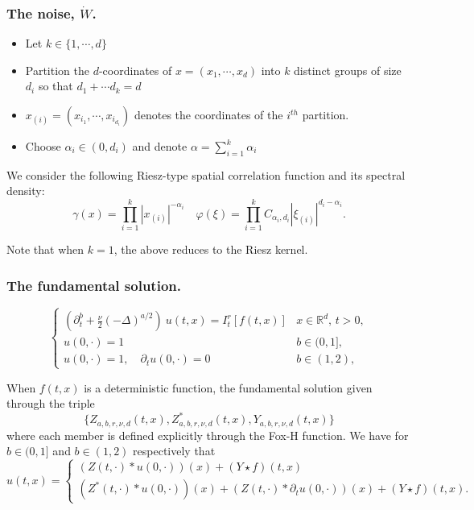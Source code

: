 \documentclass{beamer}%
\numberwithin{equation}{section}
\newcommand{\R}{\mathbb{R}}
\begin{document}
	\begin{frame}[t]
		\frametitle{The noise, $\dot{W}$.}
		\begin{itemize}
			\item Let $k \in \{1,\cdots,d\}$
			\item Partition the $d$-coordinates of $x=(x_1,\cdots,x_d)$ into $k$ distinct groups of size $d_i$ so that $d_1 + \cdots d_k =d$
			\item $x_{(i)} = (x_{i_1},\cdots, x_{i_{d_i}})$ denotes the coordinates of the $i^{th}$ partition.
			\item Choose $\alpha_i \in (0,d_i)$ and denote $\alpha = \sum_{i=1}^k\alpha_i$
		\end{itemize}

		We consider the following Riesz-type spatial correlation function and its spectral density:
		\[
		\gamma(x) = \prod_{i=1}^k |x_{(i)}|^{-\alpha_i} \quad \varphi(\xi) = \prod_{i=1}^k C_{\alpha_i,d_i} |{\xi}_{(i)}|^{d_i-\alpha_i}.
		\]

		Note that when $k=1$, the above reduces to the Riesz kernel.
	\end{frame}

	\begin{frame}[t]
		\frametitle{The fundamental solution.}
		\[
		\begin{cases}
		\left(\partial^b_t + \frac{\nu}{2}(-\Delta)^{a/2}\right)\: u(t,x) = I^r_t \left[f(t,x)\right] & \text{$x\in \R^d$, $t>0$}, \\
		u(0,\cdot) = 1                                                                                                             & b \in (0,1],               \\
		u(0,\cdot) = 1, \quad \partial_t u(0,\cdot) = 0                                                                            & b \in (1,2),
		\end{cases}
		\]

		When $f(t,x)$ is a deterministic function, the fundamental solution given through the triple
		\[
		\{ Z_{a,b,r,\nu,d}(t,x),   Z^*_{a,b,r,\nu,d}(t,x), Y_{a,b,r,\nu,d}(t,x)\}
		\]
		where each member is defined explicitly through the Fox-H function. We have for $b \in (0,1]$ and $b \in (1,2)$ respectively that
		\[ u(t,x) =
		\begin{cases}
		(Z(t,\cdot)*u(0,\cdot))(x) + (Y\star f)(t,x)
		\\ 	(Z^*(t,\cdot)*u(0,\cdot))(x) + (Z(t,\cdot)*\partial_tu(0,\cdot))(x) + (Y\star f)(t,x).
		\end{cases}
		\]


	\end{frame}
\end{document}
